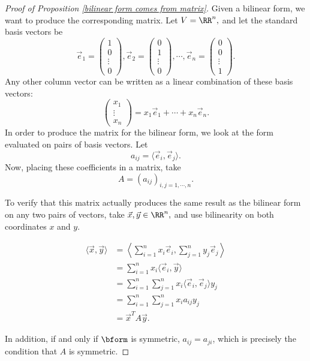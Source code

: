 \begin{proof}[Proof of Proposition \ref{bilinear form comes from matrix}]
Given a bilinear form, we want to produce the corresponding matrix. Let $V = \RR^n,$ and let the standard basis vectors be 
\[\vec{e}_1 = \begin{pmatrix}
1 \\ 0 \\ \vdots \\ 0
\end{pmatrix}, \vec{e}_2 = \begin{pmatrix}
0 \\ 1 \\ \vdots \\ 0
\end{pmatrix}, \cdots, \vec{e}_n = \begin{pmatrix}
0 \\ 0 \\ \vdots \\ 1
\end{pmatrix}.\] Any other column vector can be written as a linear combination of these basis vectors: \[\begin{pmatrix}
x_1 \\ \vdots \\ x_n
\end{pmatrix} = x_1 \vec{e}_1 + \cdots + x_n\vec{e}_n.\] In order to produce the matrix for the bilinear form, we look at the form evaluated on pairs of basis vectors. Let \[a_{ij} = \langle \vec{e}_i, \vec{e}_j \rangle.\] Now, placing these coefficients in a matrix, take \[A = (a_{ij})_{i, j = 1, \cdots, n}.\]

To verify that this matrix actually produces the same result as the bilinear form on any two pairs of vectors, take $\vec{x}, \vec{y} \in \RR^n,$ and use bilinearity on both coordinates $x$ and $y$.

\begin{align*}
    \langle \vec{x}, \vec{y}\rangle &= \left\langle \sum_{i = 1}^n x_i \vec{e}_i, \sum_{j = 1}^n y_j\vec{e}_j \right\rangle \\
    &= \sum_{i = 1}^n x_i \langle \vec{e}_i, \vec{y} \rangle \\
    &= \sum_{i = 1}^n \sum_{j = 1}^n x_i \langle \vec{e}_i, \vec{e}_j \rangle y_j \\
    &= \sum_{i = 1}^n \sum_{j = 1}^n x_i a_{ij} y_j \\
    &= \vec{x}^T A\vec{y}.
\end{align*}

In addition, if and only if $\bform$ is symmetric,  $a_{ij} = a_{ji}$, which is precisely the condition that $A$ is symmetric.
\end{proof}

